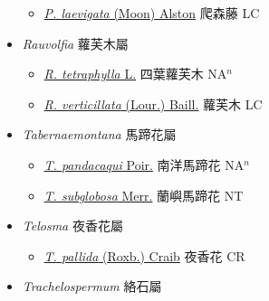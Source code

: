 \begin{itemize}
  \begin{itemize}
        \item[] \href{http://www.theplantlist.org/tpl1.1/search?q=Parsonia+laevigata}{\textit{P. laevigata} (Moon) Alston}   爬森藤 LC
  \end{itemize}
 \item[] \textit{Rauvolfia} 蘿芙木屬
                    
  \begin{itemize}
        \item[] \href{http://www.theplantlist.org/tpl1.1/search?q=Rauvolfia+tetraphylla}{\textit{R. tetraphylla} L.}   四葉蘿芙木 NA$^n$
        \item[] \href{http://www.theplantlist.org/tpl1.1/search?q=Rauvolfia+verticillata}{\textit{R. verticillata} (Lour.) Baill.}   蘿芙木 LC
  \end{itemize}
 \item[] \textit{Tabernaemontana} 馬蹄花屬
                    
  \begin{itemize}
        \item[] \href{http://www.theplantlist.org/tpl1.1/search?q=Tabernaemontana+pandacaqui}{\textit{T. pandacaqui} Poir.}   南洋馬蹄花 NA$^n$
        \item[] \href{http://www.theplantlist.org/tpl1.1/search?q=Tabernaemontana+subglobosa}{\textit{T. subglobosa} Merr.}   蘭嶼馬蹄花 NT
  \end{itemize}
 \item[] \textit{Telosma} 夜香花屬
                    
  \begin{itemize}
        \item[] \href{http://www.theplantlist.org/tpl1.1/search?q=Telosma+pallida}{\textit{T. pallida} (Roxb.) Craib}   夜香花 CR
  \end{itemize}
 \item[] \textit{Trachelospermum} 絡石屬
                    

\end{itemize}
